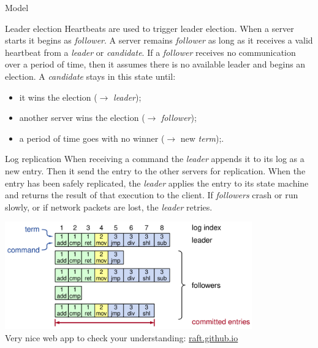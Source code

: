 \documentclass[presentation]{beamer}\mode<presentation>{\usetheme{AMSBolognaFC}}
\begin{document}
\begin{frame}[allowframebreaks]{Model}
    \framebreak
    
    \begin{block}{Leader election}
        Heartbeats are used to trigger leader election.
        When a server starts it begins as \emph{follower}.
        A server remains \emph{follower} as long as it receives a valid heartbeat from a \emph{leader} or \emph{candidate}.
        If a \emph{follower} receives no communication over a period of time, then it assumes there is no available leader and begins an election.
        A \emph{candidate} stays in this state until:
        \begin{itemize}
            \item it wins the election ($\rightarrow$ \emph{leader});
            \item another server wins the election ($\rightarrow$ \emph{follower});
            \item a period of time goes with no winner ($\rightarrow$ new \emph{term});.
        \end{itemize}   
 \end{block}
    
    \framebreak
    
    \begin{block}{Log replication}
        When receiving a command the \emph{leader} appends it to its log as a new entry.
        Then it send the entry to the other servers for replication.
        When the entry has been safely replicated, the \emph{leader} applies the entry to its state machine and returns the result of that execution to the client.
        If \emph{followers} crash or run slowly, or if network packets are lost, the \emph{leader} retries.
    \end{block}

    \framebreak

    \centering
    \includegraphics[width=0.8\textwidth]{figures/log.png}
    \\\vspace{2em}
    Very nice web app to check your understanding: \alert{\href{https://raft.github.io/}{raft.github.io}}

\end{frame}
\end{document}

